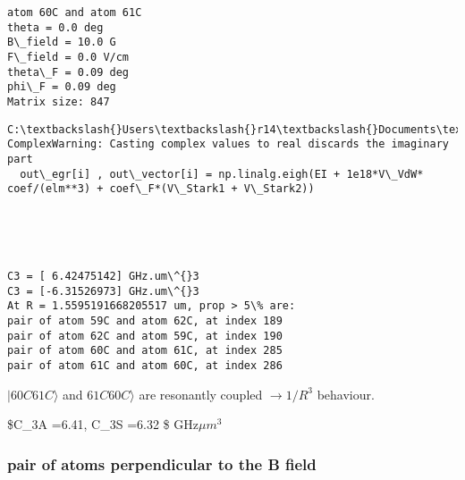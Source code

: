 \documentclass{article}
\begin{document}
    \begin{Verbatim}[commandchars=\\\{\}]
atom 60C and atom 61C
theta = 0.0 deg
B\_field = 10.0 G
F\_field = 0.0 V/cm
theta\_F = 0.09 deg
phi\_F = 0.09 deg
Matrix size: 847
    \end{Verbatim}

    \begin{Verbatim}[commandchars=\\\{\}]
C:\textbackslash{}Users\textbackslash{}r14\textbackslash{}Documents\textbackslash{}GitHub\textbackslash{}test\textbackslash{}python\textbackslash{}cal\_VdW.py:271: ComplexWarning: Casting complex values to real discards the imaginary part
  out\_egr[i] , out\_vector[i] = np.linalg.eigh(EI + 1e18*V\_VdW* coef/(elm**3) + coef\_F*(V\_Stark1 + V\_Stark2))
    \end{Verbatim}

    \begin{center}
    \end{center}
    { \hspace*{\fill} \\}
    
    \begin{center}
    \end{center}
    { \hspace*{\fill} \\}
    
    \begin{Verbatim}[commandchars=\\\{\}]
C3 = [ 6.42475142] GHz.um\^{}3
C3 = [-6.31526973] GHz.um\^{}3
At R = 1.5595191668205517 um, prop > 5\% are:
pair of atom 59C and atom 62C, at index 189
pair of atom 62C and atom 59C, at index 190
pair of atom 60C and atom 61C, at index 285
pair of atom 61C and atom 60C, at index 286
    \end{Verbatim}

    \(|60C61C\rangle\) and \(61C60C\rangle\) are resonantly coupled
\(\longrightarrow 1/R^3\) behaviour.

\$C\_3A =6.41, C\_3S =6.32 \$ GHz\(\mu m^3\)

\subsubsection{pair of atoms perpendicular to the B
field}\label{pair-of-atoms-perpendicular-to-the-b-field}
\end{document}
